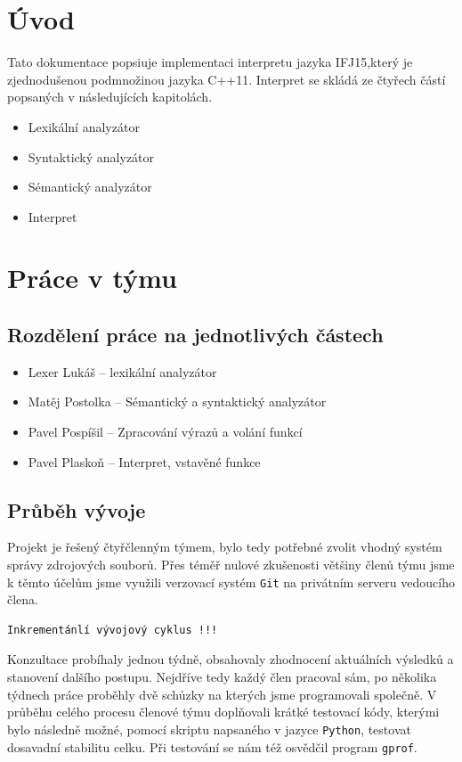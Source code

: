 \documentclass[a4paper, 12pt]{article}
\begin{document}
\tableofcontents
\newpage
\section{Úvod} \label{uvod}

Tato dokumentace popsiuje implementaci interpretu jazyka IFJ15,který je
zjednodušenou podmnožinou jazyka C++11. Interpret se skládá ze čtyřech částí
popsaných v následujících kapitolách.

\begin{itemize}
	\item Lexikální analyzátor
	\item Syntaktický analyzátor
	\item Sémantický analyzátor
	\item Interpret
\end{itemize}
\section{Práce v týmu} \label{team}

\subsection{Rozdělení práce na jednotlivých částech}
\begin{itemize}
	\item Lexer Lukáš -- lexikální analyzátor
	\item Matěj Postolka -- Sémantický a syntaktický analyzátor
	\item Pavel Pospíšil -- Zpracování výrazů a volání funkcí
	\item Pavel Plaskoň -- Interpret, vstavěné funkce
\end{itemize}

\subsection{Průběh vývoje}
Projekt je řešený čtyřčlenným týmem, bylo tedy potřebné zvolit vhodný systém
správy zdrojových souborů. Přes téměř nulové zkušenosti většiny členů týmu jsme
k těmto účelům jsme využili verzovací systém \texttt{Git} na privátním serveru
vedoucího člena.
\begin{verbatim}
Inkrementánlí vývojový cyklus !!!
\end{verbatim}
Konzultace probíhaly jednou týdně, obsahovaly zhodnocení aktuálních výsledků
a stanovení dalšího postupu. Nejdříve tedy každý člen pracoval sám, po několika
týdnech práce proběhly dvě schůzky na kterých jsme programovali společně.
V průběhu celého procesu členové týmu doplňovali krátké testovací kódy, kterými
bylo následně možné, pomocí skriptu napsaného v jazyce \texttt{Python}, testovat
dosavadní stabilitu celku. Při testování se nám též osvědčil program
\texttt{gprof}.
\end{document}
